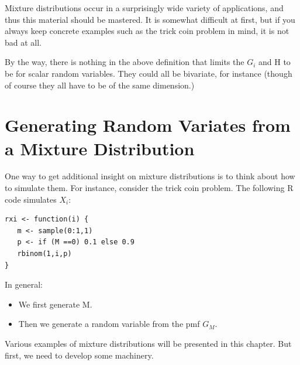 Mixture distributions occur in a surprisingly wide variety of
applications, and thus this material should be mastered.  It is somewhat
difficult at first, but if you always keep concrete examples such as the
trick coin problem in mind, it is not bad at all.

By the way, there is nothing in the above definition that limits the
$G_i$ and H to be for scalar random variables.  They could all be
bivariate, for instance (though of course they all have to be of the
same dimension.)

\section{Generating Random Variates from a Mixture Distribution}

One way to get additional insight on mixture distributions is to think
about how to simulate them.  For instance, consider the trick coin problem.
The following R code simulates $X_i$:

\begin{lstlisting}
rxi <- function(i) {
   m <- sample(0:1,1)
   p <- if (M ==0) 0.1 else 0.9
   rbinom(1,i,p)
}
\end{lstlisting}

In general:

\begin{itemize}

\item We first generate M.

\item Then we generate a random variable from the pmf $G_M$.

\end{itemize}

Various examples of mixture distributions will be presented in this
chapter.  But first, we need to develop some machinery.

